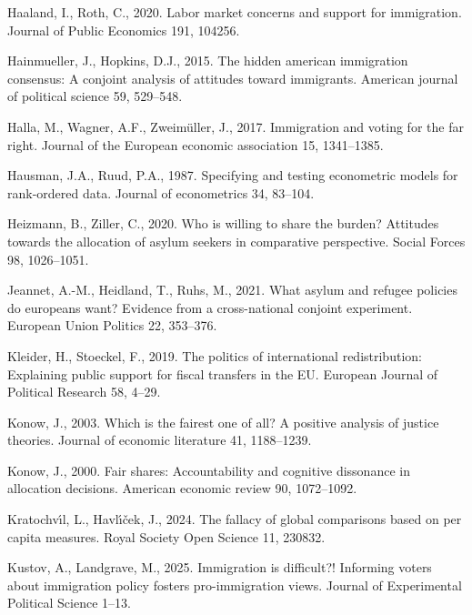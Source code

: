 \documentclass[
  12pt,
  a4paper,
]{article}
\newlength{\cslhangindent}
\newenvironment{CSLReferences}[2] %
 {\begin{list}{}{%
  \setlength{\itemindent}{0pt}
  \setlength{\leftmargin}{0pt}
  \setlength{\parsep}{0pt}
  \ifodd #1
   \setlength{\leftmargin}{\cslhangindent}
   \setlength{\itemindent}{-1\cslhangindent}
  \fi
  \setlength{\itemsep}{#2\baselineskip}}}
 {\end{list}}
\begin{document}
\begin{CSLReferences}{1}{0}
Haaland, I., Roth, C., 2020. Labor market concerns and support for immigration. Journal of Public Economics 191, 104256.

Hainmueller, J., Hopkins, D.J., 2015. The hidden american immigration consensus: A conjoint analysis of attitudes toward immigrants. American journal of political science 59, 529--548.

Halla, M., Wagner, A.F., Zweimüller, J., 2017. Immigration and voting for the far right. Journal of the European economic association 15, 1341--1385.

Hausman, J.A., Ruud, P.A., 1987. Specifying and testing econometric models for rank-ordered data. Journal of econometrics 34, 83--104.

Heizmann, B., Ziller, C., 2020. Who is willing to share the burden? Attitudes towards the allocation of asylum seekers in comparative perspective. Social Forces 98, 1026--1051.

Jeannet, A.-M., Heidland, T., Ruhs, M., 2021. What asylum and refugee policies do europeans want? Evidence from a cross-national conjoint experiment. European Union Politics 22, 353--376.

Kleider, H., Stoeckel, F., 2019. The politics of international redistribution: Explaining public support for fiscal transfers in the EU. European Journal of Political Research 58, 4--29.

Konow, J., 2003. Which is the fairest one of all? A positive analysis of justice theories. Journal of economic literature 41, 1188--1239.

Konow, J., 2000. Fair shares: Accountability and cognitive dissonance in allocation decisions. American economic review 90, 1072--1092.

Kratochvı́l, L., Havlı́ček, J., 2024. The fallacy of global comparisons based on per capita measures. Royal Society Open Science 11, 230832.

Kustov, A., Landgrave, M., 2025. Immigration is difficult?! Informing voters about immigration policy fosters pro-immigration views. Journal of Experimental Political Science 1--13.


\end{CSLReferences}
\end{document}
